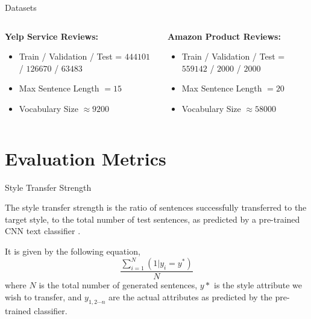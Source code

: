 \documentclass[aspectratio=169]{beamer}
\begin{document}
\begin{frame}{Datasets}
	\begin{columns}[T] %
		\begin{column}{.48\textwidth}
			\Large
			\textbf{Yelp Service Reviews:}
			\begin{itemize}
				\item Train / Validation / Test = $444101$ / $126670$ / $63483$
				\item Max Sentence Length $= 15$
				\item Vocabulary Size $\approx 9200$
			\end{itemize}
		\end{column}
		\hfill
		\begin{column}{.48\textwidth}
			\Large
			\textbf{Amazon Product Reviews:}
			\begin{itemize}
				\item Train / Validation / Test = $559142$ / $2000$ / $2000$
				\item Max Sentence Length $= 20$
				\item Vocabulary Size $\approx 58000$
			\end{itemize}
		\end{column}
	\end{columns}

\end{frame}

\section{Evaluation Metrics}

\begin{frame}{Style Transfer Strength}

	The style transfer strength is the ratio of sentences successfully transferred to the target style, to the total number of test sentences, as predicted by a pre-trained CNN text classifier \citep{kim2014convolutional}.

	It is given by the following equation,
	\begin{equation*}
		\frac{\sum_{i=1}^{N}{(1 | y_i = y^*)}}{N}
	\end{equation*}
	where $N$ is the total number of generated sentences, $y*$ is the style attribute we wish to transfer, and $y_{1, 2 \cdots n}$ are the actual attributes as predicted by the pre-trained classifier.
\end{frame}
\end{document}
